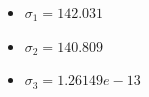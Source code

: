 \begin{itemize}
    \item $\sigma_1 = 142.031$
    \item $\sigma_2 = 140.809$
    \item $\sigma_3 = 1.26149e-13$
\end{itemize}
